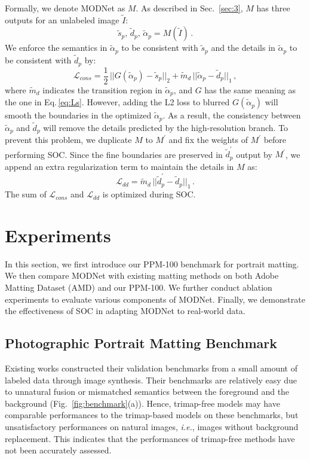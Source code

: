 \documentclass[letterpaper]{article} \usepackage{aaai22}  \usepackage{times}  \usepackage{helvet}  \usepackage{courier}  \usepackage[hyphens]{url}  \usepackage{graphicx} \urlstyle{rm} \def\UrlFont{\rm}  \usepackage{natbib}  \usepackage{caption} \usepackage{booktabs}
\begin{document}
Formally, we denote MODNet as $M$. As described in Sec.~\ref{sec:3}, $M$ has three outputs for an unlabeled image $\tilde{I}$:
\begin{equation}
    \tilde{s}_{p}, \, \tilde{d}_{p}, \, \tilde{\alpha}_{p} = M(\tilde{I}) \, .
\end{equation}
We enforce the semantics in $\tilde{\alpha}_{p}$ to be consistent with $\tilde{s}_{p}$ and the details in $\tilde{\alpha}_{p}$ to be consistent with $\tilde{d}_{p}$ by:
\begin{equation}\label{eq:Lcons}
    \mathcal{L}_{cons} = \frac{1}{2} \, \big|\big| G(\tilde{\alpha}_{p}) - \tilde{s}_{p} \big|\big|_{2}  +  \tilde{m}_d \, \big|\big| \tilde{\alpha}_{p} - \tilde{d}_{p} \big|\big|_{1}  \, ,
\end{equation}
where $\tilde{m}_d$ indicates the transition region in $\tilde{\alpha}_p$, and $G$ has the same meaning as the one in Eq.\,\ref{eq:Ls}.
However, adding the L2 loss to blurred $G(\tilde{\alpha}_{p})$ will smooth the boundaries in the optimized $\tilde{\alpha}_{p}$.
As a result, the consistency between $\tilde{\alpha}_{p}$ and $\tilde{d}_{p}$ will remove the details predicted by the high-resolution branch. To prevent this problem, we duplicate $M$ to $M^{\prime}$ and fix the weights of $M^{\prime}$ before performing SOC. Since the fine boundaries are preserved in $\tilde{d}^{\prime}_p$ output by $M^{\prime}$, we append an extra regularization term to maintain the details in $M$ as:
\begin{equation}\label{eq:Ldc}
    \mathcal{L}_{dd} = \tilde{m}_d \, \big|\big| \tilde{d}_{p}^{\prime} - \tilde{d}_{p} \big|\big|_{1} \, .
\end{equation}
The sum of $\mathcal{L}_{cons}$ and $\mathcal{L}_{dd}$ is optimized during SOC.




\section{Experiments}
In this section, we first introduce our PPM-100 benchmark for portrait matting. We then compare MODNet with existing matting methods on both Adobe Matting Dataset (AMD) \cite{DIM} and our PPM-100. We further conduct ablation experiments to evaluate various components of MODNet. Finally, we demonstrate the effectiveness of SOC in adapting MODNet to real-world data.

\subsection{Photographic Portrait Matting Benchmark}\label{sec:benchmark}
Existing works constructed their validation benchmarks from a small amount of labeled data through image synthesis. Their benchmarks are relatively easy due to unnatural fusion or mismatched semantics between the foreground and the background (Fig.~\ref{fig:benchmark}(a)). Hence, trimap-free models may have comparable performances to the trimap-based models on these benchmarks, but unsatisfactory performances on natural images, {\it i.e.}, images without background replacement. This indicates that the performances of trimap-free methods have not been accurately assessed. 
\end{document}
